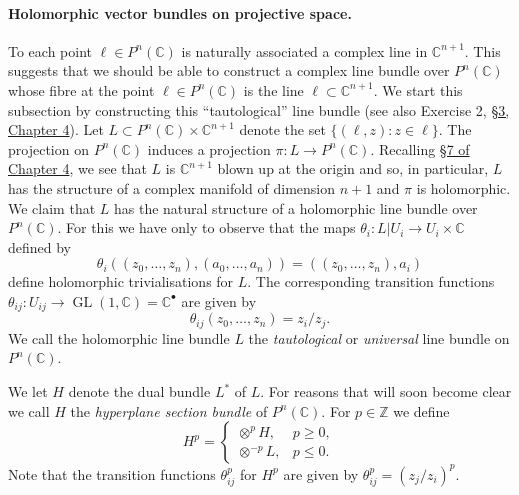 \paragraph{Holomorphic vector bundles on projective space.}
To each point $\ell\in P^n(\mathbb C)$ is naturally associated a complex line in $\mathbb C^{n+1}$. This suggests that we should be able to construct a complex line bundle over $P^n(\mathbb C)$ whose fibre at the point $\ell\in P^n(\mathbb C)$ is the line $\ell\subset\mathbb C^{n+1}$. We start this subsection by constructing this ``tautological'' line bundle (see also Exercise 2, \hyperref[sec:4:3]{\S3, Chapter 4}).
Let $L\subset P^n(\mathbb C)\times\mathbb C^{n+1}$ denote the set $\{(\ell,z):z\in\ell\}$. The projection on $P^n(\mathbb C)$ induces a projection $\pi:L\to P^n(\mathbb C)$. Recalling \hyperref[sec:4:7]{\S7 of Chapter 4}, we see that $L$ is $\mathbb C^{n+1}$ blown up at the origin and so, in particular, $L$ has the structure of a complex manifold of dimension $n+1$ and $\pi$ is holomorphic. We claim that $L$ has the natural structure of a holomorphic line bundle over $P^n(\mathbb C)$. For this we have only to observe that the maps $\theta_i:L|U_i\to U_i\times\mathbb C$ defined by
\[\theta_i((z_0,\ldots,z_n),(a_0,\ldots,a_n))=((z_0,\ldots,z_n),a_i)\]
define holomorphic trivialisations for $L$. The corresponding transition functions $\theta_{ij}:U_{ij}\to\operatorname{GL}(1,\mathbb C)=\mathbb C^\bullet$ are given by
\[\theta_{ij}(z_0,\ldots,z_n)=z_i/z_j.\]
We call the holomorphic line bundle $L$ the \emph{tautological} or \emph{universal} line bundle on $P^n(\mathbb C)$.

We let $H$ denote the dual bundle $L^*$ of $L$. For reasons that will soon become clear we call $H$ the \emph{hyperplane section bundle} of $P^n(\mathbb C)$. For $p\in\mathbb Z$ we define
\[H^p=\begin{cases}\otimes^pH,&p\geq0,\\\otimes^{-p}L,&p\leq0.\end{cases}\]
Note that the transition functions $\theta_{ij}^p$ for $H^p$ are given by $\theta_{ij}^p=(z_j/z_i)^p$.

